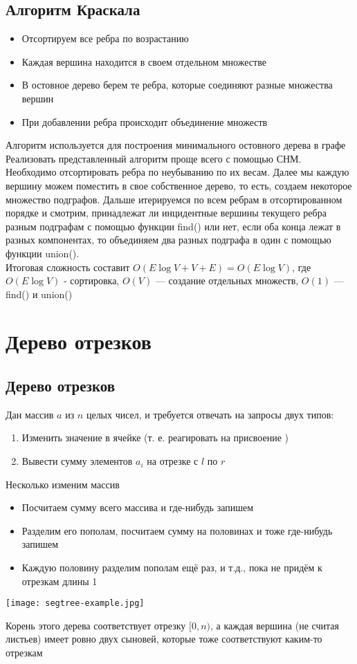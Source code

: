 \documentclass[a4paper]{article}
\begin{document}
\subsection{Алгоритм Краскала}
\begin{itemize}
    \item Отсортируем все ребра по возрастанию
    \item Каждая вершина находится в своем отдельном множестве
    \item В остовное дерево берем те ребра, которые соединяют разные множества вершин
    \item При добавлении ребра происходит объединение множеств
\end{itemize}
Алгоритм используется для построения минимального остовного дерева в графе\\[2mm]
Реализовать представленный алгоритм проще всего с помощью СНМ. Необходимо отсортировать ребра по неубыванию по их весам. Далее мы каждую вершину можем поместить в свое собственное дерево, то есть, создаем некоторое множество подграфов. Дальше итерируемся по всем ребрам в отсортированном порядке и смотрим, принадлежат ли инцидентные вершины текущего ребра разным подграфам с помощью функции find() или нет, если оба конца лежат в разных компонентах, то объединяем два разных подграфа в один с помощью функции union().\\[2mm]
Итоговая сложность составит $O(E\log V+V+E)=O(E\log V)$, где $O(E\log V)$ - сортировка, $O(V)$ — создание отдельных множеств, $O(1)$ — find() и union()

\newpage
\section{Дерево отрезков}
\subsection{Дерево отрезков}
Дан массив $a$ из $n$ целых чисел, и требуется отвечать на запросы двух типов:
\begin{enumerate}
    \item Изменить значение в ячейке (т. е. реагировать на присвоение )
    \item Вывести сумму элементов $a_i$ на отрезке с $l$ по $r$
\end{enumerate}
Несколько изменим массив
\begin{itemize}
    \item Посчитаем сумму всего массива и где-нибудь запишем
    \item Разделим его пополам, посчитаем сумму на половинах и тоже где-нибудь запишем
    \item Каждую половину разделим пополам ещё раз, и т.д., пока не придём к отрезкам длины 1
\end{itemize}
\begin{center}
    \texttt{[image: segtree-example.jpg]}
    \label{segtree-ex}
\end{center}
Корень этого дерева соответствует отрезку $[0, n)$, а каждая вершина (не считая листьев) имеет ровно двух сыновей, которые тоже соответствуют каким-то отрезкам
\end{document}
